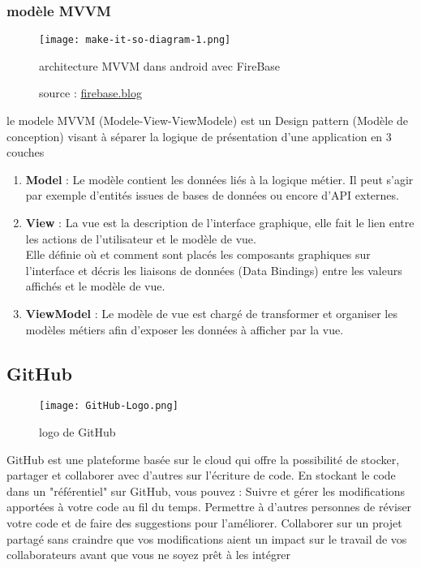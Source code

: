 \subsubsection{modèle MVVM}

\begin{figure}[h]
    \centering
    \texttt{[image: make-it-so-diagram-1.png]}
    \caption{architecture MVVM dans android avec FireBase}
    \label{MVVM ARCH }
    \caption*{\small{source : \url{firebase.blog}}}
\end{figure}
le modele MVVM (Modele-View-ViewModele) est un Design pattern (Modèle de conception) visant à séparer la logique de présentation d'une application en 3 couches 
\begin{enumerate}
    \item \textbf{Model} : Le modèle contient les données liés à la logique métier. Il peut s'agir par exemple d'entités issues de bases de données ou encore d'API externes.
    \item \textbf{View} : La vue est la description de l'interface graphique, elle fait le lien entre les actions de l'utilisateur et le modèle de vue.\\ Elle définie où et comment sont placés les composants graphiques sur l'interface et décris les liaisons de données (Data Bindings) entre les valeurs affichés et le modèle de vue.
    \item \textbf{ViewModel} : Le modèle de vue est chargé de transformer et organiser les modèles métiers afin d'exposer les données à afficher par la vue.
\end{enumerate}
\cite{arkancesystemsQuestPattern}

\subsection{GitHub}
\begin{wrapfigure}{r}{0.25\textwidth} 
    \centering
    \texttt{[image: GitHub-Logo.png]}
    \caption{logo de GitHub}
\end{wrapfigure}
GitHub est une plateforme basée sur le cloud  qui offre la possibilité de stocker, partager et collaborer avec d'autres sur l'écriture de code. En stockant le code dans un "référentiel" sur GitHub, vous pouvez :
Suivre et gérer les modifications apportées à votre code au fil du temps.
Permettre à d'autres personnes de réviser votre code et de faire des suggestions pour l'améliorer.
Collaborer sur un projet partagé sans craindre que vos modifications aient un impact sur le travail de vos collaborateurs avant que vous ne soyez prêt à les intégrer

